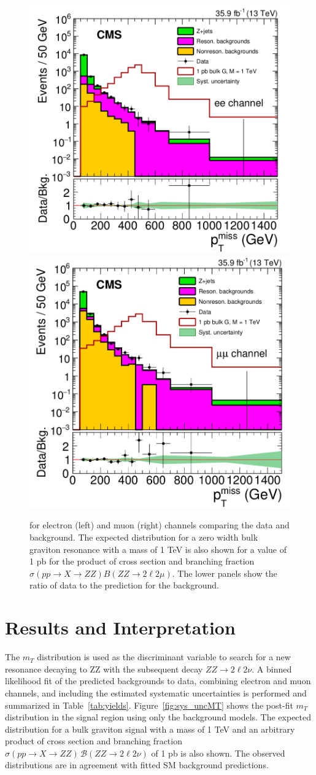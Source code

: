 \begin{figure}[htbp]
\begin{center}
\includegraphics[width=0.49\linewidth]{figures/sys_elSRuncMET.png}
\includegraphics[width=0.49\linewidth]{figures/sys_muSRuncMET.png}
\caption{\ptmiss for electron (left) and muon (right) channels comparing the data and background. The expected distribution for a zero width bulk graviton resonance with a mass of 1 TeV is also shown for a value of 1 pb for the product of cross section and branching fraction $\sigma(pp\rightarrow X\rightarrow ZZ)B(ZZ\rightarrow 2\ell 2\mu)$. The lower panels show the ratio of data to the prediction for the background. }
\label{fig:sys_uncMET}
\end{center}
\end{figure}


\section{Results and Interpretation}
The $m_T$ distribution is used as the discriminant variable to search for a new resonance decaying to ZZ with the subsequent decay $ZZ\rightarrow 2\ell 2\nu$. A binned likelihood fit of the predicted backgrounds to data, combining electron and muon channels, and including the estimated systematic uncertainties is performed and summarized in Table~\ref{tab:yields}. Figure~\ref{fig:sys_uncMT} shows the post-fit $m_T$ distribution in the signal region using only the background models. The expected distribution for a bulk graviton signal with a mass of 1 TeV and an arbitrary product of cross section and branching fraction $\sigma(pp \to X\to ZZ)\, \mathcal{B} (ZZ\to2\ell2\nu)$ of 1 pb is also shown. The observed distributions are in agreement with fitted SM background predictions.

